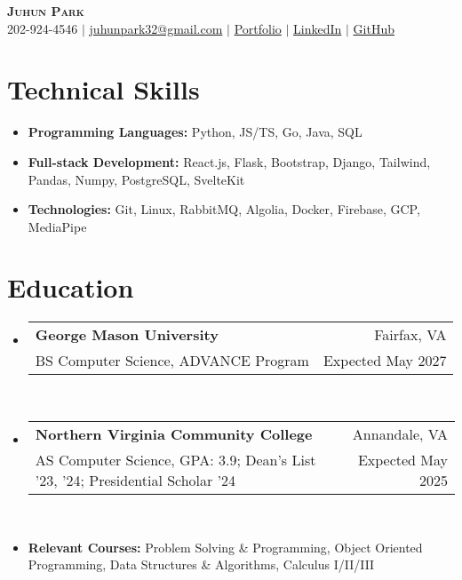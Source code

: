 \documentclass[letterpaper,11pt]{article}
\makeatletter
\newcommand{\resumeItem}[1]{
  \item\small{
    {#1 \vspace{0pt}}
  }
}
\newcommand{\resumeItemThin}[1]{
  \item\small{
    {#1 \vspace{-5pt}}
  }
}
\newcommand{\resumeSubheading}[4]{
    \item
    \begin{tabular*}{0.985\textwidth}[t]{l@{\extracolsep{\fill}}r@{\hspace{-0.1in}}}
        \small{\textbf{#1}} & \small{#2} \\
        \small#3 & \small #4 \\
    \end{tabular*}\vspace{-5pt}
}
\newcommand{\resumeSubHeadingListStart}{\begin{itemize}[leftmargin=0.00in, rightmargin=-0.2in, label={}]\vspace{1pt}}
\newcommand{\resumeSubHeadingListEnd}{\end{itemize}\vspace{-7pt}}
\newcommand{\resumeItemListStart}{\begin{itemize}[leftmargin=0.15in, rightmargin=0.15in]}
\newcommand{\resumeItemListEnd}{\end{itemize}\vspace{-7pt}}
\makeatother
\begin{document}

\begin{center}
  \textbf{\Huge \scshape {Juhun Park}} \\ \vspace{1pt}
  \small 202-924-4546 $|$
  \href{mailto:juhunpark32@gmail.com}{juhunpark32@gmail.com} $|$
  \href{https://juhun-park.vercel.app/}{Portfolio} $|$
  \href{https://linkedin.com/in/juhun-park}{LinkedIn} $|$
  \href{https://github.com/juhun32}{GitHub} \\
\end{center}

\vspace{-10pt}


\section{Technical Skills}
\vspace{3pt}
\resumeItemListStart
\resumeItemThin{\textbf{Programming Languages: }{Python, JS/TS, Go, Java, SQL}}\\
\resumeItemThin{\textbf{Full-stack Development: }{React.js, Flask, Bootstrap, Django, Tailwind, Pandas, Numpy, PostgreSQL, SvelteKit}}\\
\resumeItemThin{\textbf{Technologies: }{Git, Linux, RabbitMQ, Algolia, Docker, Firebase, GCP, MediaPipe}}\\
\resumeItemListEnd


\section{Education}
\resumeSubHeadingListStart
\resumeSubheading
{George Mason University}{Fairfax, VA}
{BS Computer Science, ADVANCE Program}{Expected May 2027}\\

\resumeSubheading
{Northern Virginia Community College}{Annandale, VA}
{AS Computer Science, GPA: 3.9; Dean's List '23, '24; Presidential Scholar '24}{Expected May 2025} \\

\resumeItem{\textbf{Relevant Courses: }{Problem Solving \& Programming, Object Oriented Programming, Data Structures \& Algorithms, Calculus I/II/III}}
\resumeSubHeadingListEnd
\vspace{-3pt}
\end{document}

